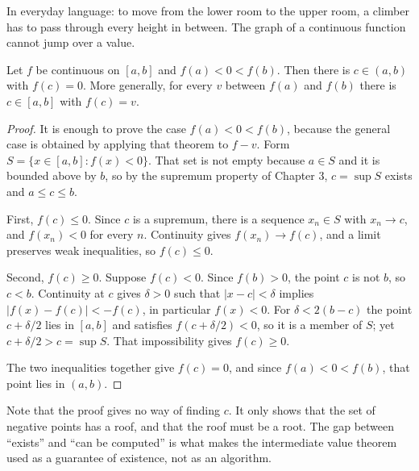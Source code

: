 In everyday language: to move from the lower room to the upper room, a climber has to
pass through every height in between. The graph of a continuous function cannot jump over
a value.

\begin{teorema}
Let $f$ be continuous on $[a,b]$ and $f(a)<0<f(b)$. Then there is $c\in(a,b)$ with
$f(c)=0$. More generally, for every $v$ between $f(a)$ and $f(b)$ there is $c\in[a,b]$
with $f(c)=v$.
\end{teorema}

\begin{proof}
It is enough to prove the case $f(a)<0<f(b)$, because the general case is obtained by
applying that theorem to $f-v$. Form $S=\{x\in[a,b] : f(x)<0\}$. That set is not empty
because $a\in S$ and it is bounded above by $b$, so by the supremum property of Chapter 3,
$c=\sup S$ exists and $a\le c\le b$.

First, $f(c)\le 0$. Since $c$ is a supremum, there is a sequence $x_{n}\in S$ with
$x_{n}\to c$, and $f(x_{n})<0$ for every $n$. Continuity gives $f(x_{n})\to f(c)$, and a
limit preserves weak inequalities, so $f(c)\le 0$.

Second, $f(c)\ge 0$. Suppose $f(c)<0$. Since $f(b)>0$, the point $c$ is not $b$, so
$c<b$. Continuity at $c$ gives $\delta>0$ such that $|x-c|<\delta$ implies
$|f(x)-f(c)|<-f(c)$, in particular $f(x)<0$. For $\delta<2(b-c)$ the point $c+\delta/2$
lies in $[a,b]$ and satisfies $f(c+\delta/2)<0$, so it is a member of $S$; yet
$c+\delta/2>c=\sup S$. That impossibility gives $f(c)\ge 0$.

The two inequalities together give $f(c)=0$, and since $f(a)<0<f(b)$, that point lies in
$(a,b)$.
\end{proof}

Note that the proof gives no way of finding $c$. It only shows that the set of negative
points has a roof, and that the roof must be a root. The gap between ``exists'' and
``can be computed'' is what makes the intermediate value theorem used as a guarantee of
existence, not as an algorithm.

